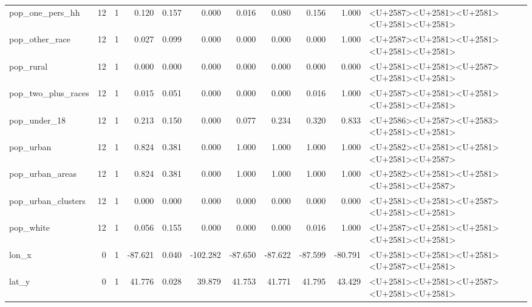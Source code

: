 \documentclass{ucetd}
\begin{document}
\begin{table}
{\begin{tabular}[t]{lrrrrrrrrrl}
pop\_one\_pers\_hh & 12 & 1 & 0.120 & 0.157 & 0.000 & 0.016 & 0.080 & 0.156 & 1.000 & <U+2587><U+2581><U+2581><U+2581><U+2581>\\
\addlinespace
pop\_other\_race & 12 & 1 & 0.027 & 0.099 & 0.000 & 0.000 & 0.000 & 0.000 & 1.000 & <U+2587><U+2581><U+2581><U+2581><U+2581>\\
pop\_rural & 12 & 1 & 0.000 & 0.000 & 0.000 & 0.000 & 0.000 & 0.000 & 0.000 & <U+2581><U+2581><U+2587><U+2581><U+2581>\\
pop\_two\_plus\_races & 12 & 1 & 0.015 & 0.051 & 0.000 & 0.000 & 0.000 & 0.016 & 1.000 & <U+2587><U+2581><U+2581><U+2581><U+2581>\\
pop\_under\_18 & 12 & 1 & 0.213 & 0.150 & 0.000 & 0.077 & 0.234 & 0.320 & 0.833 & <U+2586><U+2587><U+2583><U+2581><U+2581>\\
pop\_urban & 12 & 1 & 0.824 & 0.381 & 0.000 & 1.000 & 1.000 & 1.000 & 1.000 & <U+2582><U+2581><U+2581><U+2581><U+2587>\\
\addlinespace
pop\_urban\_areas & 12 & 1 & 0.824 & 0.381 & 0.000 & 1.000 & 1.000 & 1.000 & 1.000 & <U+2582><U+2581><U+2581><U+2581><U+2587>\\
pop\_urban\_clusters & 12 & 1 & 0.000 & 0.000 & 0.000 & 0.000 & 0.000 & 0.000 & 0.000 & <U+2581><U+2581><U+2587><U+2581><U+2581>\\
pop\_white & 12 & 1 & 0.056 & 0.155 & 0.000 & 0.000 & 0.000 & 0.016 & 1.000 & <U+2587><U+2581><U+2581><U+2581><U+2581>\\
lon\_x & 0 & 1 & -87.621 & 0.040 & -102.282 & -87.650 & -87.622 & -87.599 & -80.791 & <U+2581><U+2581><U+2581><U+2587><U+2581>\\
lat\_y & 0 & 1 & 41.776 & 0.028 & 39.879 & 41.753 & 41.771 & 41.795 & 43.429 & <U+2581><U+2581><U+2587><U+2581><U+2581>\\
\bottomrule
\end{tabular}}
\end{table}

\begin{table}

\caption{\label{tab:descr-stats}Date-time Variables}
\centering
{}
\end{table}
\end{document}
